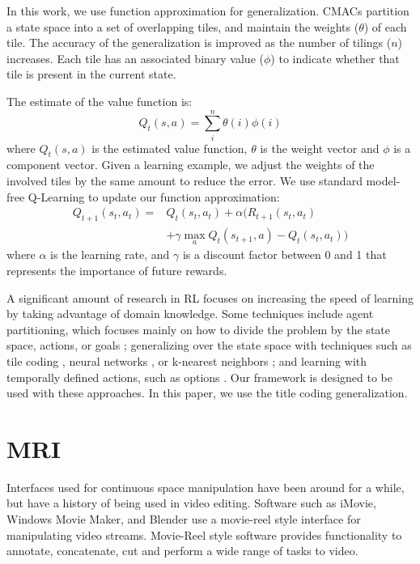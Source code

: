 \documentclass[letterpaper, 10 pt, conference]{ieeeconf}
\begin{document}
In this work, we use function approximation for generalization. CMACs \cite{brains-behavior-robotics} partition a state space into a set of overlapping tiles, and maintain the weights ($\theta$) of each tile. The accuracy of the generalization is improved as the number of tilings ($n$) increases. Each tile has an associated binary value ($\phi$) to indicate whether that tile is present in the current state. 

The estimate of the value function is:
%
\begin{equation}
Q_t(s,a) = \sum_i^n \theta(i)\phi(i)
\end{equation}
%
where $Q_t(s,a)$ is the estimated value function, $\theta$ is the weight vector and $\phi$ is a component vector. Given a learning example, we adjust the weights of the involved tiles by the same amount to reduce the error. We use standard model-free Q-Learning to update our function approximation:
%
\begin{align}
 Q_{t+1}(s_t, a_t) = & Q_t(s_t, a_t) + \alpha (R_{t+1}(s_t,a_t) \\
& + \gamma \max_aQ_t(s_{t+1},a) - Q_t(s_t, a_t)) \nonumber
\end{align}
%
where $\alpha$ is the learning rate, and $\gamma$ is a discount factor between 0 and 1 that represents the importance of future rewards.

A significant amount of research in RL focuses on increasing the speed of learning by taking advantage of domain knowledge. Some techniques include agent partitioning, which focuses mainly on how to divide the problem by the state space, actions, or goals \cite{Curran:2013:AHC:2484920.2485183,716791,Reddy_learninggoal-decomposition}; generalizing over the state space with techniques such as tile coding \cite{whiteson:tr07}, neural networks \cite{Haykin:1998:NNC:521706}, or k-nearest neighbors \cite{tdknn}; and learning with temporally defined actions, such as options \cite{Sutton:1999:MSF:319103.319108}. Our framework is designed to be used with these approaches. In this paper, we use the title coding generalization. 


\section{MRI}
\label{MRI}
Interfaces used for continuous space manipulation have been around for a while, but have a history of being used in video editing. Software such as iMovie, Windows Movie Maker, and Blender use a movie-reel style interface for manipulating video streams. Movie-Reel style software provides functionality to annotate, concatenate, cut and perform a wide range of tasks to video.  
\end{document}
